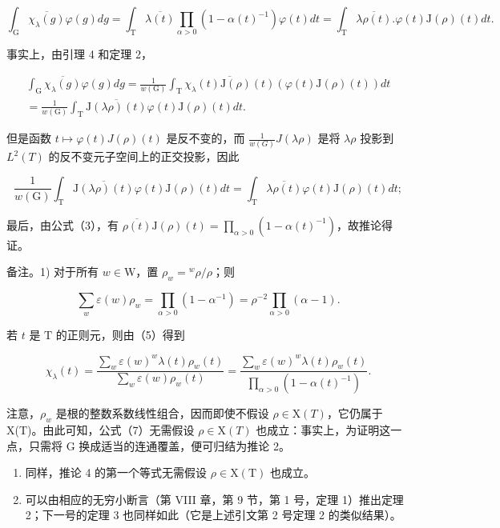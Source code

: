 \[
\int_ {\mathrm{G}} \overline {{\chi_ {\lambda} (g)}} \varphi (g) d g = \int_ {\mathrm{T}} \overline {{\lambda (t)}} \prod_ {\alpha > 0} (1 - \alpha (t) ^ {- 1}) \varphi (t) d t = \int_ {\mathrm{T}} \overline {{\lambda \rho (t)}}. \varphi (t) \mathrm{J} (\rho) (t) d t.
\]

事实上，由引理 4 和定理 2，

\[
\begin{array}{c} \int_ {\mathrm{G}} \overline {{\chi_ {\lambda} (g)}} \varphi (g) d g = \frac {1}{w (\mathrm{G})} \int_ {\mathrm{T}} \overline {{\chi_ {\lambda} (t) \mathrm{J} (\rho) (t)}} (\varphi (t) \mathrm{J} (\rho) (t)) d t \\ = \frac {1}{w (\mathrm{G})} \int_ {\mathrm{T}} \overline {{\mathrm{J} (\lambda \rho) (t)}} \varphi (t) \mathrm{J} (\rho) (t) d t. \end{array}
\]

但是函数 \(t \mapsto \varphi(t)J(\rho)(t)\) 是反不变的，而 \(\frac{1}{w(G)}J(\lambda\rho)\) 是将 \(\lambda\rho\) 投影到 \(L^{2}(T)\) 的反不变元子空间上的正交投影，因此

\[
\frac {1}{w (\mathrm{G})} \int_ {\mathrm{T}} \overline {{\mathrm{J} (\lambda \rho) (t)}} \varphi (t) \mathrm{J} (\rho) (t) d t = \int_ {\mathrm{T}} \overline {{\lambda \rho (t)}} \varphi (t) \mathrm{J} (\rho) (t) d t;
\]

最后，由公式（3），有 \(\overline{\rho(t)}\mathrm{J}(\rho)(t) = \prod_{\alpha >0}(1 - \alpha (t)^{-1})\)，故推论得证。

备注。1) 对于所有 \(w \in \mathrm{W}\)，置 \(\rho_w = {}^w\rho /\rho\)；则

\[
\sum_ {w} \varepsilon (w) \rho_ {w} = \prod_ {\alpha > 0} (1 - \alpha^ {- 1}) = \rho^ {- 2} \prod_ {\alpha > 0} (\alpha - 1).\tag{6}
\]

若 \(t\) 是 \(\mathrm{T}\) 的正则元，则由（5）得到

\[
\chi_ {\lambda} (t) = \frac {\sum_ {w} \varepsilon (w) ^ {w} \lambda (t) \rho_ {w} (t)}{\sum_ {w} \varepsilon (w) \rho_ {w} (t)} = \frac {\sum_ {w} \varepsilon (w) ^ {w} \lambda (t) \rho_ {w} (t)}{\prod_ {\alpha > 0} (1 - \alpha (t) ^ {- 1})}.\tag{7}
\]

注意，\(\rho_{w}\) 是根的整数系数线性组合，因而即使不假设 \(\rho \in \mathrm{X}(T)\)，它仍属于 X(T)。由此可知，公式（7）无需假设 \(\rho \in \mathrm{X}(T)\) 也成立：事实上，为证明这一点，只需将 G 换成适当的连通覆盖，便可归结为推论 2。

\begin{enumerate}
\def\labelenumi{\arabic{enumi})}
\setcounter{enumi}{1}
\item
  同样，推论 4 的第一个等式无需假设 \(\rho \in \mathrm{X}(\mathrm{T})\) 也成立。
\item
  可以由相应的无穷小断言（第 VIII 章，第 9 节，第 1 号，定理 1）推出定理 2；下一号的定理 3 也同样如此（它是上述引文第 2 号定理 2 的类似结果）。
\end{enumerate}

